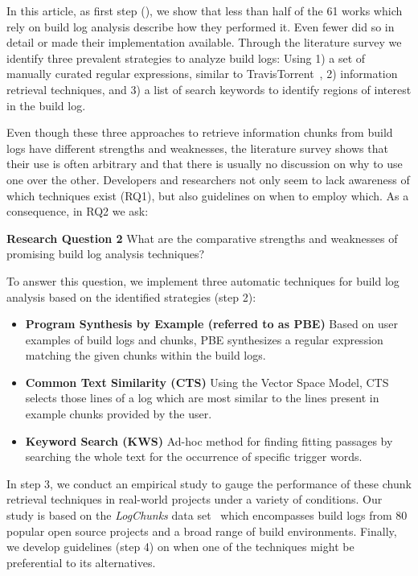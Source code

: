 In this article, as first step (), we show that
less than half of the 61 works which rely on build log analysis
describe how they performed it.
Even fewer did so in detail or
made their implementation available.
Through the literature
survey we identify three prevalent strategies to
analyze build logs: Using 1) a set of
manually curated regular expressions,
similar to TravisTorrent~\cite{beller2017oops},
2) information
retrieval techniques,
and 3) a list of search keywords
to identify regions of interest in the build log.

Even though these three approaches to retrieve information chunks from
build logs have different strengths and weaknesses, the literature
survey shows that their use is often arbitrary and that there is
usually no discussion on why to use one over the other.
Developers and
researchers not only seem to lack awareness of which techniques exist
(RQ1), but also guidelines on when to employ which.
As a consequence,
in RQ2 we ask:

\begin{simplebox}[minipage boxed title*=-5cm]{\textbf{Research Question
2}}
What are the comparative strengths and weaknesses
of promising build log analysis techniques?
\end{simplebox}

To answer this question, we implement three automatic techniques for
build log analysis based on the identified strategies (step 2):

\begin{itemize}
  \item \textbf{Program Synthesis by Example (referred to as PBE)}
  Based on user examples of build logs and chunks, PBE
  synthesizes
  a regular expression matching the given chunks within the build logs.
  \item \textbf{Common Text Similarity (CTS)}
  Using the Vector Space Model, CTS selects those lines of a log which are
  most similar to the lines present in example chunks provided by
  the user.
  \item \textbf{Keyword Search (KWS)}
  Ad-hoc method for finding fitting passages by searching the whole
  text for
  the occurrence of specific trigger words.
\end{itemize}


In step 3, we conduct an empirical study to gauge the performance of
these chunk retrieval techniques in
real-world projects under a variety of conditions.
Our study is based on the \emph{LogChunks} data
set~\cite{brandt2020logchunks} which encompasses build logs from
80 popular open source projects and a broad range of
build environments.
Finally, we develop guidelines (step 4) on when
one of the techniques might be preferential to its alternatives.



